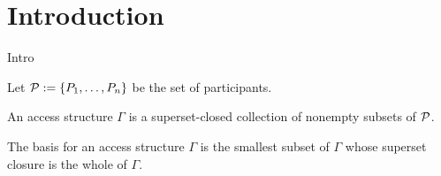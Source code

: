 \chapter{Introduction}

Intro
\cite{Phillips1992}

Let ${\mathcal P} := \{ P_1, \dots, P_n \}$ be the set of participants.

An access structure $\Gamma$ is a superset-closed collection of nonempty subsets of ${\mathcal P}$.

The basis for an access structure $\Gamma$ is the smallest subset of $\Gamma$ whose superset closure is the whole of $\Gamma$.

